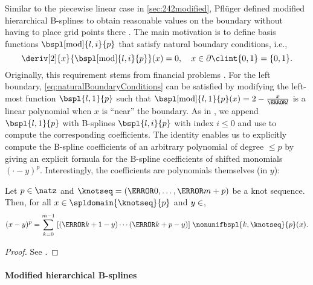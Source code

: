 Similar to the piecewise linear case in \cref{sec:242modified},
Pflüger defined modified
hierarchical B-splines to obtain reasonable values on the boundary
without having to place grid points there \cite{Pflueger10Spatially}.
The main motivation is to define basis
functions $\bspl[\modified]{l,i}{p}$ that satisfy natural boundary
conditions, i.e.,
\begin{equation}
  \label{eq:naturalBoundaryConditions}
  \deriv[2]{x}{\bspl[\modified]{l,i}{p}}(x) = 0,\quad
  x \in \bndrydomain{\clint{0, 1}} = \{0, 1\}.
\end{equation}
Originally, this requirement stems from financial problems
\cite{Pflueger10Spatially}.
For the left boundary,
\eqref{eq:naturalBoundaryConditions} can be satisfied by
modifying the left-most function $\bspl{l,1}{p}$ such that
$\bspl[\modified]{l,1}{p}(x) = 2 - \tfrac{x}{\ms{l}}$ is a linear polynomial
when $x$ is ``near'' the boundary.
As in \cite{Pflueger10Spatially},
we append $\bspl{l,1}{p}$ with
B-splines $\bspl{l,i}{p}$ with index $i \le 0$ and
use  to compute the corresponding coefficients.
The identity enables us to explicitly compute the B-spline coefficients
of an arbitrary polynomial of degree $\le p$ by giving an explicit formula
for the B-spline coefficients of shifted monomials $({\cdot} - y)^p$.
Interestingly, the coefficients are polynomials themselves (in $y$):

\vspace*{0pt plus 0.5fill}

\begin{lemma}
  \label{lemma:marsden}
  Let $p \in \natz$ and
  $\knotseq = (\knot{0}, \dotsc, \knot{m+p})$ be a knot sequence.
  Then, for all $x \in \spldomain{\knotseq}{p}$ and $y \in \real$,
  \begin{equation}
    \label{eq:marsden}
    (x - y)^p
    = \sum_{k=0}^{m-1}
    \;\bracket*{(\knot{k+1} - y) \dotsm (\knot{k+p} - y)}\;
    \nonunifbspl{k,\knotseq}{p}(x).
  \end{equation}
\end{lemma}

\begin{proof}
  See \cite{Hoellig13Approximation}.
\end{proof}

\vspace*{0pt plus 1fill}

\paragraph{Modified hierarchical B-splines}

